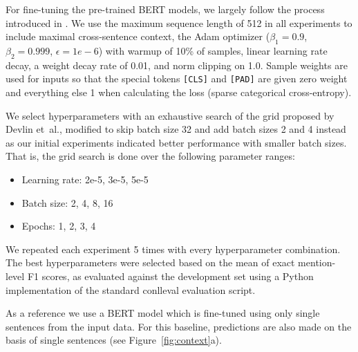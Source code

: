 For fine-tuning the pre-trained BERT models, we largely follow the process introduced in \cite{devlin2018bert}.
We use the maximum sequence length of 512 in all experiments to include maximal cross-sentence context, the Adam optimizer \cite{kingma2014adam} ($\beta_1 = 0.9$, $\beta_2 = 0.999$, $\epsilon = 1e-6$) with warmup of 10\% of samples, linear learning rate decay, a weight decay rate of 0.01, and norm clipping on 1.0. Sample weights are used for inputs so that the special tokens \texttt{[CLS]} and \texttt{[PAD]} are given zero weight and everything else 1 when calculating the loss (sparse categorical cross-entropy).
 
We select hyperparameters with an exhaustive search of the grid proposed by Devlin et~al., modified to skip batch size 32 and add batch sizes 2 and 4 instead as our initial experiments indicated better performance with smaller batch sizes. That is, the grid search is done over the following parameter ranges: 
\begin{itemize}
    \setlength\itemsep{-0.5em}
    \item Learning rate: 2e-5, 3e-5, 5e-5 
    \item Batch size: 2, 4, 8, 16
    \item Epochs: 1, 2, 3, 4
\end{itemize}
We repeated each experiment 5 times with every hyperparameter combination. The best hyperparameters were selected based on the mean of exact mention-level F1 scores, as evaluated against the development set using a Python implementation of the standard conlleval evaluation script.

As a reference we use a BERT model which is fine-tuned using only single sentences from the input data. For this baseline, predictions are also made on the basis of single sentences (see Figure~\ref{fig:context}a).

